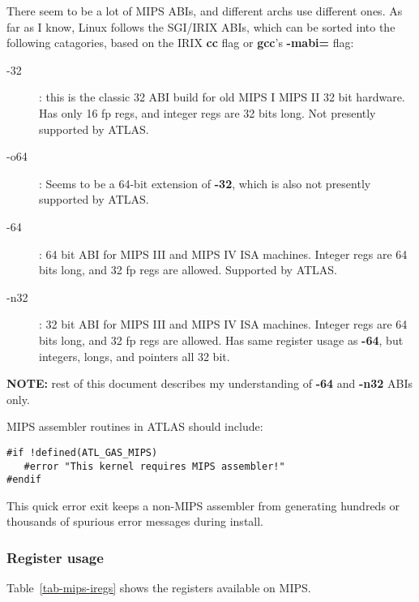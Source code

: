 \documentclass[11pt]{article}
\begin{document}
There seem to be a lot of MIPS ABIs, and different archs use different
ones.  As far as I know, Linux follows the SGI/IRIX ABIs, which can
be sorted into the following catagories, based on the IRIX {\bf cc}
flag or {\bf gcc}'s {\bf -mabi=} flag:
\begin{description}
\item [-32]: this is the classic 32 ABI build for old MIPS I MIPS II 32 bit
             hardware.  Has only 16 fp regs, and integer regs are 32 bits long.
             Not presently supported by ATLAS.
\item [-o64]: Seems to be a 64-bit extension of {\bf -32}, which is also
              not presently supported by ATLAS.
\item [-64]: 64 bit ABI for MIPS III and MIPS IV ISA machines.
             Integer regs are 64 bits long, and 32 fp regs are allowed.
             Supported by ATLAS.  
\item [-n32]: 32 bit ABI for MIPS III and MIPS IV ISA machines.  
              Integer regs are 64 bits long, and 32 fp regs are allowed.
              Has same register usage as {\bf -64}, but integers, longs, and
              pointers all 32 bit. 
\end{description}

{\bf NOTE:} rest of this document describes my understanding of {\bf -64}
and {\bf -n32} ABIs only.

MIPS assembler routines in ATLAS should include:
\begin{verbatim}
#if !defined(ATL_GAS_MIPS)
   #error "This kernel requires MIPS assembler!"
#endif
\end{verbatim}
This quick error exit keeps a non-MIPS assembler from generating hundreds
or thousands of spurious error messages during install.

\subsubsection{Register usage}
Table~\ref{tab-mips-iregs} shows the registers available on MIPS.
\end{document}
